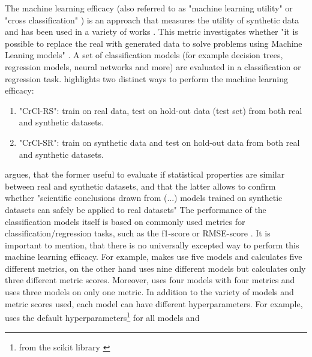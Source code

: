 The machine learning efficacy (also referred to as "machine learning utility"\cite{zhang2021GANBLRTabularData} or "cross classification" \cite{goncalves2020GenerationEvaluationSynthetic}) is an approach that measures the utility of synthetic data and has been used in a variety of works \cite{zhao2022CTABGANEnhancingTabular, xu2019ModelingTabularData, zhang2021GANBLRTabularData, bourou2021ReviewTabularData, ge2021KaminoConstraintawareDifferentially}.
This metric investigates whether "it is possible to replace the real with generated data to solve problems using Machine Leaning models" \cite[p. 7]{bourou2021ReviewTabularData}.
A set of classification models (for example decision trees, regression models, neural networks and more) are evaluated in a classification or regression task.
\cite[p. 7]{goncalves2020GenerationEvaluationSynthetic} highlights two distinct ways to perform the machine learning efficacy:
\begin{enumerate}
  \item "CrCl-RS": train on real data, test on hold-out data (test set) from both real and synthetic datasets.
  \item "CrCl-SR": train on synthetic data and test on hold-out data from both real and synthetic datasets.
\end{enumerate}
\cite{goncalves2020GenerationEvaluationSynthetic} argues, that the former useful to evaluate if statistical properties are similar between real and synthetic datasets,
and that the latter allows to confirm whether "scientific conclusions drawn from (...) models trained on synthetic datasets can safely be applied to real datasets" \cite[p. 7]{goncalves2020GenerationEvaluationSynthetic}
The performance of the classification models itself is based on commonly used metrics for classification/regression tasks, such as the f1-score or RMSE-score \cite{bourou2021ReviewTabularData, chundawat2022UniversalMetricRobust}.
It is important to mention, that there is no universally excepted way to perform this machine learning efficacy.
For example, \cite{zhao2022CTABGANEnhancingTabular} makes use five models and calculates five different metrics, 
\cite{ge2021KaminoConstraintawareDifferentially} on the other hand uses nine different models but calculates only three different metric scores.
Moreover, \cite{kunar2021DTGANDifferentialPrivatea} uses four models with four metrics and \cite{kim2021OCTGANNeuralODEbased} uses three models on only one metric.
In addition to the variety of models and metric scores used, each model can have different hyperparameters.
For example, \cite{kunar2021DTGANDifferentialPrivatea} uses the default hyperparameters\footnote{from the scikit library \cite{scikit-learn}} for all models and 
